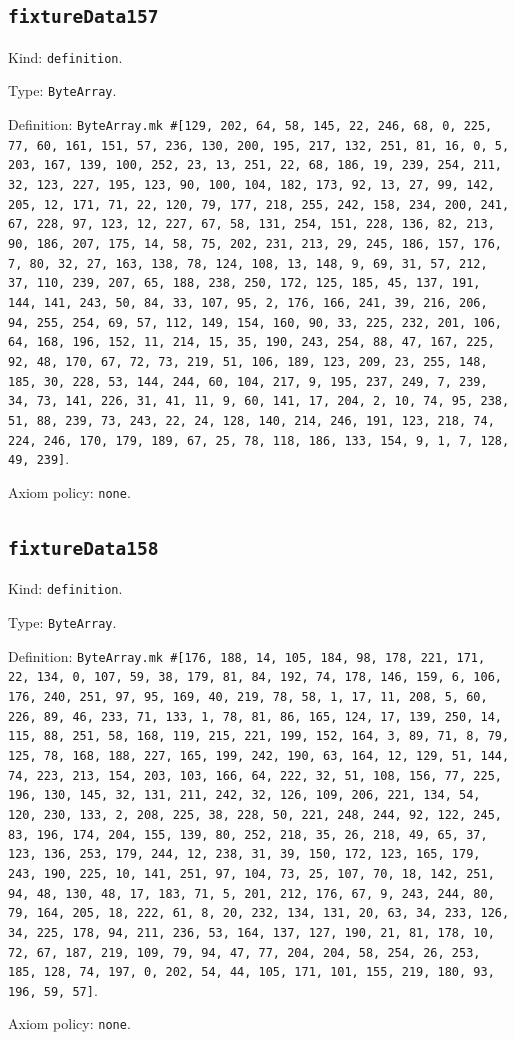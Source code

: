 \documentclass[11pt]{article}
\begin{document}
\subsection*{\texttt{fixtureData157}}
\noindent Kind: \texttt{definition}.\par
\noindent Type: \texttt{ByteArray}.\par
\noindent Definition: \texttt{ByteArray.mk \#[129, 202, 64, 58, 145, 22, 246, 68, 0, 225, 77, 60, 161, 151, 57, 236, 130, 200, 195, 217, 132, 251, 81, 16, 0, 5, 203, 167, 139, 100, 252, 23, 13, 251, 22, 68, 186, 19, 239, 254, 211, 32, 123, 227, 195, 123, 90, 100, 104, 182, 173, 92, 13, 27, 99, 142, 205, 12, 171, 71, 22, 120, 79, 177, 218, 255, 242, 158, 234, 200, 241, 67, 228, 97, 123, 12, 227, 67, 58, 131, 254, 151, 228, 136, 82, 213, 90, 186, 207, 175, 14, 58, 75, 202, 231, 213, 29, 245, 186, 157, 176, 7, 80, 32, 27, 163, 138, 78, 124, 108, 13, 148, 9, 69, 31, 57, 212, 37, 110, 239, 207, 65, 188, 238, 250, 172, 125, 185, 45, 137, 191, 144, 141, 243, 50, 84, 33, 107, 95, 2, 176, 166, 241, 39, 216, 206, 94, 255, 254, 69, 57, 112, 149, 154, 160, 90, 33, 225, 232, 201, 106, 64, 168, 196, 152, 11, 214, 15, 35, 190, 243, 254, 88, 47, 167, 225, 92, 48, 170, 67, 72, 73, 219, 51, 106, 189, 123, 209, 23, 255, 148, 185, 30, 228, 53, 144, 244, 60, 104, 217, 9, 195, 237, 249, 7, 239, 34, 73, 141, 226, 31, 41, 11, 9, 60, 141, 17, 204, 2, 10, 74, 95, 238, 51, 88, 239, 73, 243, 22, 24, 128, 140, 214, 246, 191, 123, 218, 74, 224, 246, 170, 179, 189, 67, 25, 78, 118, 186, 133, 154, 9, 1, 7, 128, 49, 239]}.\par
\noindent Axiom policy: \texttt{none}.\par
\subsection*{\texttt{fixtureData158}}
\noindent Kind: \texttt{definition}.\par
\noindent Type: \texttt{ByteArray}.\par
\noindent Definition: \texttt{ByteArray.mk \#[176, 188, 14, 105, 184, 98, 178, 221, 171, 22, 134, 0, 107, 59, 38, 179, 81, 84, 192, 74, 178, 146, 159, 6, 106, 176, 240, 251, 97, 95, 169, 40, 219, 78, 58, 1, 17, 11, 208, 5, 60, 226, 89, 46, 233, 71, 133, 1, 78, 81, 86, 165, 124, 17, 139, 250, 14, 115, 88, 251, 58, 168, 119, 215, 221, 199, 152, 164, 3, 89, 71, 8, 79, 125, 78, 168, 188, 227, 165, 199, 242, 190, 63, 164, 12, 129, 51, 144, 74, 223, 213, 154, 203, 103, 166, 64, 222, 32, 51, 108, 156, 77, 225, 196, 130, 145, 32, 131, 211, 242, 32, 126, 109, 206, 221, 134, 54, 120, 230, 133, 2, 208, 225, 38, 228, 50, 221, 248, 244, 92, 122, 245, 83, 196, 174, 204, 155, 139, 80, 252, 218, 35, 26, 218, 49, 65, 37, 123, 136, 253, 179, 244, 12, 238, 31, 39, 150, 172, 123, 165, 179, 243, 190, 225, 10, 141, 251, 97, 104, 73, 25, 107, 70, 18, 142, 251, 94, 48, 130, 48, 17, 183, 71, 5, 201, 212, 176, 67, 9, 243, 244, 80, 79, 164, 205, 18, 222, 61, 8, 20, 232, 134, 131, 20, 63, 34, 233, 126, 34, 225, 178, 94, 211, 236, 53, 164, 137, 127, 190, 21, 81, 178, 10, 72, 67, 187, 219, 109, 79, 94, 47, 77, 204, 204, 58, 254, 26, 253, 185, 128, 74, 197, 0, 202, 54, 44, 105, 171, 101, 155, 219, 180, 93, 196, 59, 57]}.\par
\noindent Axiom policy: \texttt{none}.\par
\end{document}
